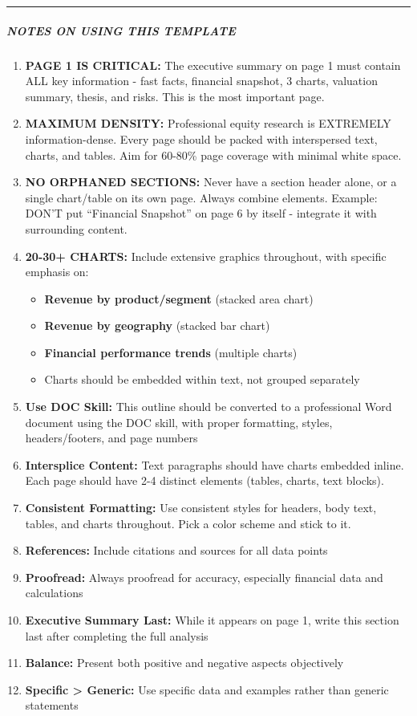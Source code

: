 \documentclass[11pt]{article}
\begin{document}
\vspace{0.5em}\hrule\vspace{0.5em}

\subparagraph{NOTES ON USING THIS TEMPLATE}\mbox{}\par

\begin{enumerate}[leftmargin=*,itemsep=2pt,topsep=2pt]
\item {} \textbf{PAGE 1 IS CRITICAL:} The executive summary on page 1 must contain ALL key information - fast facts, financial snapshot, 3 charts, valuation summary, thesis, and risks. This is the most important page.
\item {} \textbf{MAXIMUM DENSITY:} Professional equity research is EXTREMELY information-dense. Every page should be packed with interspersed text, charts, and tables. Aim for 60-80\% page coverage with minimal white space.
\item {} \textbf{NO ORPHANED SECTIONS:} Never have a section header alone, or a single chart/table on its own page. Always combine elements. Example: DON'T put ``Financial Snapshot'' on page 6 by itself - integrate it with surrounding content.
\item {} \textbf{20-30+ CHARTS:} Include extensive graphics throughout, with specific emphasis on:
\begin{itemize}[leftmargin=*,itemsep=2pt,topsep=2pt]
\item {} \textbf{Revenue by product/segment} (stacked area chart)
\item {} \textbf{Revenue by geography} (stacked bar chart)
\item {} \textbf{Financial performance trends} (multiple charts)
\item {} Charts should be embedded within text, not grouped separately
\end{itemize}
\item {} \textbf{Use DOC Skill:} This outline should be converted to a professional Word document using the DOC skill, with proper formatting, styles, headers/footers, and page numbers
\item {} \textbf{Intersplice Content:} Text paragraphs should have charts embedded inline. Each page should have 2-4 distinct elements (tables, charts, text blocks).
\item {} \textbf{Consistent Formatting:} Use consistent styles for headers, body text, tables, and charts throughout. Pick a color scheme and stick to it.
\item {} \textbf{References:} Include citations and sources for all data points
\item {} \textbf{Proofread:} Always proofread for accuracy, especially financial data and calculations
\item {} \textbf{Executive Summary Last:} While it appears on page 1, write this section last after completing the full analysis
\item {} \textbf{Balance:} Present both positive and negative aspects objectively
\item {} \textbf{Specific > Generic:} Use specific data and examples rather than generic statements
\end{enumerate}
\end{document}
